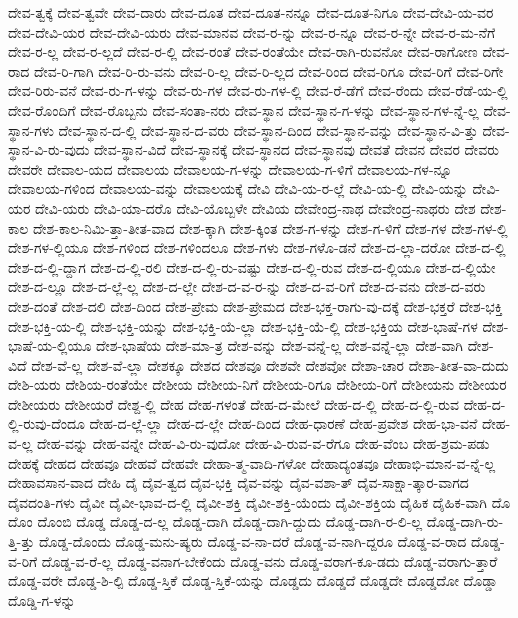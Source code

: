 {ದೇವ-ತ್ವಕ್ಕೆ
ದೇವ-ತ್ವವೇ
ದೇವ-ದಾರು
ದೇವ-ದೂತ
ದೇವ-ದೂತ-ನನ್ನೂ
ದೇವ-ದೂತ-ನಿಗೂ
ದೇವ-ದೇವಿ-ಯ-ವರ
ದೇವ-ದೇವಿ-ಯರ
ದೇವ-ದೇವಿ-ಯರು
ದೇವ-ಮಾನವ
ದೇವ-ರ-ನ್ನು
ದೇವ-ರ-ನ್ನೂ
ದೇವ-ರ-ನ್ನೇ
ದೇವ-ರ-ಮ-ನೆಗೆ
ದೇವ-ರ-ಲ್ಲ
ದೇವ-ರ-ಲ್ಲದೆ
ದೇವ-ರ-ಲ್ಲಿ
ದೇವ-ರಂತೆ
ದೇವ-ರಂತೆಯೇ
ದೇವ-ರಾಗಿ-ರುವನೋ
ದೇವ-ರಾಗೋಣ
ದೇವ-ರಾದ
ದೇವ-ರಿ-ಗಾಗಿ
ದೇವ-ರಿ-ರು-ವನು
ದೇವ-ರಿ-ಲ್ಲ
ದೇವ-ರಿ-ಲ್ಲದ
ದೇವ-ರಿಂದ
ದೇವ-ರಿಗೂ
ದೇವ-ರಿಗೆ
ದೇವ-ರಿಗೇ
ದೇವ-ರಿರು-ವನೆ
ದೇವ-ರು-ಗ-ಳನ್ನು
ದೇವ-ರು-ಗಳ
ದೇವ-ರು-ಗಳ-ಲ್ಲಿ
ದೇವ-ರೆ-ಡೆಗೆ
ದೇವ-ರೆಂದು
ದೇವ-ರೆಡೆ-ಯ-ಲ್ಲಿ
ದೇವ-ರೊಂದಿಗೆ
ದೇವ-ರೊಬ್ಬನು
ದೇವ-ಸಂತಾ-ನರು
ದೇವ-ಸ್ಥಾನ
ದೇವ-ಸ್ಥಾನ-ಗ-ಳನ್ನು
ದೇವ-ಸ್ಥಾನ-ಗಳ-ನ್ನೆ-ಲ್ಲ
ದೇವ-ಸ್ಥಾನ-ಗಳು
ದೇವ-ಸ್ಥಾನ-ದ-ಲ್ಲಿ
ದೇವ-ಸ್ಥಾನ-ದ-ವರು
ದೇವ-ಸ್ಥಾನ-ದಿಂದ
ದೇವ-ಸ್ಥಾನ-ವನ್ನು
ದೇವ-ಸ್ಥಾನ-ವಿ-ತ್ತು
ದೇವ-ಸ್ಥಾನ-ವಿ-ರು-ವುದು
ದೇವ-ಸ್ಥಾನ-ವಿದೆ
ದೇವ-ಸ್ಥಾನಕ್ಕೆ
ದೇವ-ಸ್ಥಾನದ
ದೇವ-ಸ್ಥಾನವು
ದೇವತೆ
ದೇವನ
ದೇವರ
ದೇವರು
ದೇವರೇ
ದೇವಾಲ-ಯದ
ದೇವಾಲಯ
ದೇವಾಲಯ-ಗ-ಳನ್ನು
ದೇವಾಲಯ-ಗ-ಳಿಗೆ
ದೇವಾಲಯ-ಗಳ-ನ್ನೂ
ದೇವಾಲಯ-ಗಳಿಂದ
ದೇವಾಲಯ-ವನ್ನು
ದೇವಾಲಯಕ್ಕೆ
ದೇವಿ
ದೇವಿ-ಯ-ರ-ಲ್ಲೆ
ದೇವಿ-ಯ-ಲ್ಲಿ
ದೇವಿ-ಯನ್ನು
ದೇವಿ-ಯರ
ದೇವಿ-ಯರು
ದೇವಿ-ಯಾ-ದರೊ
ದೇವಿ-ಯೊಬ್ಬಳೇ
ದೇವಿಯ
ದೇವೇಂದ್ರ-ನಾಥ
ದೇವೇಂದ್ರ-ನಾಥರು
ದೇಶ
ದೇಶ-ಕಾಲ
ದೇಶ-ಕಾಲ-ನಿಮಿ-ತ್ತಾ-ತೀತ-ವಾದ
ದೇಶ-ಕ್ಕಾಗಿ
ದೇಶ-ಕ್ಕಿಂತ
ದೇಶ-ಗ-ಳನ್ನು
ದೇಶ-ಗ-ಳಿಗೆ
ದೇಶ-ಗಳ
ದೇಶ-ಗಳ-ಲ್ಲಿ
ದೇಶ-ಗಳ-ಲ್ಲಿಯೂ
ದೇಶ-ಗಳಿಂದ
ದೇಶ-ಗಳಿಂದಲೂ
ದೇಶ-ಗಳು
ದೇಶ-ಗಳೊ-ಡನೆ
ದೇಶ-ದ-ಲ್ಲಾ-ದರೋ
ದೇಶ-ದ-ಲ್ಲಿ
ದೇಶ-ದ-ಲ್ಲಿ-ದ್ದಾಗ
ದೇಶ-ದ-ಲ್ಲಿ-ರಲಿ
ದೇಶ-ದ-ಲ್ಲಿ-ರು-ವಷ್ಟು
ದೇಶ-ದ-ಲ್ಲಿ-ರುವ
ದೇಶ-ದ-ಲ್ಲಿಯೂ
ದೇಶ-ದ-ಲ್ಲಿಯೇ
ದೇಶ-ದ-ಲ್ಲೂ
ದೇಶ-ದ-ಲ್ಲೆ-ಲ್ಲ
ದೇಶ-ದ-ಲ್ಲೇ
ದೇಶ-ದ-ವ-ರ-ನ್ನು
ದೇಶ-ದ-ವ-ರಿಗೆ
ದೇಶ-ದ-ವನು
ದೇಶ-ದ-ವರು
ದೇಶ-ದಂತೆ
ದೇಶ-ದಲಿ
ದೇಶ-ದಿಂದ
ದೇಶ-ಪ್ರೇಮ
ದೇಶ-ಪ್ರೇಮದ
ದೇಶ-ಭಕ್ತ-ರಾಗು-ವು-ದಕ್ಕೆ
ದೇಶ-ಭಕ್ತರೆ
ದೇಶ-ಭಕ್ತಿ
ದೇಶ-ಭಕ್ತಿ-ಯ-ಲ್ಲಿ
ದೇಶ-ಭಕ್ತಿ-ಯನ್ನು
ದೇಶ-ಭಕ್ತಿ-ಯೆ-ಲ್ಲಾ
ದೇಶ-ಭಕ್ತಿ-ಯೆ-ಲ್ಲಿ
ದೇಶ-ಭಕ್ತಿಯ
ದೇಶ-ಭಾಷೆ-ಗಳ
ದೇಶ-ಭಾಷೆ-ಯ-ಲ್ಲಿಯೂ
ದೇಶ-ಭಾಷೆಯ
ದೇಶ-ಮಾ-ತ್ರ
ದೇಶ-ವನ್ನು
ದೇಶ-ವನ್ನೆ-ಲ್ಲ
ದೇಶ-ವನ್ನೆ-ಲ್ಲಾ
ದೇಶ-ವಾಗಿ
ದೇಶ-ವಿದೆ
ದೇಶ-ವೆ-ಲ್ಲ
ದೇಶ-ವೆ-ಲ್ಲಾ
ದೇಶಕ್ಕೂ
ದೇಶದ
ದೇಶವೂ
ದೇಶವೇ
ದೇಶವೋ
ದೇಶಾ-ಚಾರ
ದೇಶಾ-ತೀತ-ವಾ-ದುದು
ದೇಶಿ-ಯರು
ದೇಶಿಯ-ರಂತೆಯೇ
ದೇಶೀಯ
ದೇಶೀಯ-ನಿಗೆ
ದೇಶೀಯ-ರಿಗೂ
ದೇಶೀಯ-ರಿಗೆ
ದೇಶೀಯನು
ದೇಶೀಯರ
ದೇಶೀಯರು
ದೇಶೀಯರೆ
ದೇಶ್ದ-ಲ್ಲಿ
ದೇಹ
ದೇಹ-ಗಳಂತೆ
ದೇಹ-ದ-ಮೇಲೆ
ದೇಹ-ದ-ಲ್ಲಿ
ದೇಹ-ದ-ಲ್ಲಿ-ರುವ
ದೇಹ-ದ-ಲ್ಲಿ-ರುವು-ದೆಂದೂ
ದೇಹ-ದ-ಲ್ಲೆ-ಲ್ಲಾ
ದೇಹ-ದ-ಲ್ಲೇ
ದೇಹ-ದಿಂದ
ದೇಹ-ಧಾರಣೆ
ದೇಹ-ಪ್ರವೇಶ
ದೇಹ-ಭಾ-ವನೆ
ದೇಹ-ವ-ಲ್ಲ
ದೇಹ-ವನ್ನು
ದೇಹ-ವನ್ನೇ
ದೇಹ-ವಿ-ರು-ವುದೋ
ದೇಹ-ವಿ-ರುವ-ವ-ರೆಗೂ
ದೇಹ-ವೆಂಬ
ದೇಹ-ಶ್ರಮ-ಪಡು
ದೇಹಕ್ಕೆ
ದೇಹದ
ದೇಹವೂ
ದೇಹವೆ
ದೇಹವೇ
ದೇಹಾ-ತ್ಮ-ವಾದಿ-ಗಳೋ
ದೇಹಾದ್ಯಂತವೂ
ದೇಹಾಭಿ-ಮಾನ-ವ-ನ್ನೆ-ಲ್ಲ
ದೇಹಾವಸಾನ-ವಾದ
ದೇಹಿ
ದೈ
ದೈವ-ತ್ವದ
ದೈವ-ಭಕ್ತಿ
ದೈವ-ವನ್ನು
ದೈವ-ವಶಾ-ತ್
ದೈವ-ಸಾಕ್ಷಾ-ತ್ಕಾರ-ವಾಗದ
ದೈವದಂತಿ-ಗಳು
ದೈವೀ
ದೈವೀ-ಭಾವ-ದ-ಲ್ಲಿ
ದೈವೀ-ಶಕ್ತಿ
ದೈವೀ-ಶಕ್ತಿ-ಯೆಂದು
ದೈವೀ-ಶಕ್ತಿಯ
ದೈಹಿಕ
ದೈಹಿಕ-ವಾಗಿ
ದೊ
ದೊಂ
ದೊಂಬಿ
ದೊಡ್ಡ
ದೊಡ್ಡ-ದ-ಲ್ಲ
ದೊಡ್ಡ-ದಾಗಿ
ದೊಡ್ಡ-ದಾಗಿ-ದ್ದುದು
ದೊಡ್ಡ-ದಾಗಿ-ರ-ಲಿ-ಲ್ಲ
ದೊಡ್ಡ-ದಾಗಿ-ರು-ತ್ತಿ-ತ್ತು
ದೊಡ್ಡ-ದೊಂದು
ದೊಡ್ಡ-ಮನು-ಷ್ಯರು
ದೊಡ್ಡ-ವ-ನಾ-ದರೆ
ದೊಡ್ಡ-ವ-ನಾಗಿ-ದ್ದರೂ
ದೊಡ್ಡ-ವ-ರಾದ
ದೊಡ್ಡ-ವ-ರಿಗೆ
ದೊಡ್ಡ-ವ-ರೆ-ಲ್ಲ
ದೊಡ್ಡ-ವನಾಗ-ಬೇಕೆಂದು
ದೊಡ್ಡ-ವನು
ದೊಡ್ಡ-ವರಾಗ-ಕೂ-ಡದು
ದೊಡ್ಡ-ವರಾಗು-ತ್ತಾರೆ
ದೊಡ್ಡ-ವರೇ
ದೊಡ್ಡ-ಶಿ-ಲ್ಪಿ
ದೊಡ್ಡ-ಸ್ತಿಕೆ
ದೊಡ್ಡ-ಸ್ತಿಕೆ-ಯನ್ನು
ದೊಡ್ಡದು
ದೊಡ್ಡದೆ
ದೊಡ್ಡದೇ
ದೊಡ್ಡದೋ
ದೊಡ್ಡಾ
ದೊಡ್ಡಿ-ಗ-ಳನ್ನು
}
